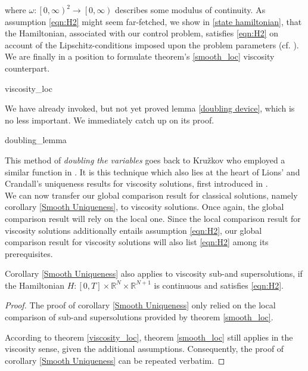 		 where $ \omega : \left[0, \infty \right)^2 \to \left[0, \infty \right) $ describes some modulus of continuity. As assumption \eqref{eqn:H2} 
		 might seem far-fetched, we show in \ref{state hamiltonian}, that the Hamiltonian, associated with our control problem, satisfies \eqref{eqn:H2} on account of the Lipschitz-conditions imposed upon the problem parameters (cf. \cite[p.~167]{zhou}). We are finally in a position to formulate theorem's \ref{smooth_loc} viscosity counterpart.
		 
		 {viscosity_loc}
		 
		 We have already invoked, but not yet proved lemma \ref{doubling device}, which is no less important. We immediately catch up on its proof.
		 
		 {doubling_lemma}
		 
		 This method of \emph{doubling the variables} goes back to Kru\v{z}kov who employed a similar function in \cite{kruvzkov}. It is this technique which also lies at the heart of Lions' and Crandall's uniqueness results for viscosity solutions, first introduced in \cite{lions}. \\
		 
		 We can now transfer our global comparison result for classical solutions, namely corollary \ref{Smooth Uniqueness}, to viscosity solutions. Once again, the global comparison result will rely on the local one. Since the local comparison result for viscosity solutions additionally entails assumption  \eqref{eqn:H2}, our global comparison result for viscosity solutions will also list \eqref{eqn:H2} among its prerequisites.
		  
		  \begin{corollary}
		  	\label{Viscosity Uniqueness}
		  	Corollary \ref{Smooth Uniqueness} also applies to viscosity sub-and supersolutions, if the Hamiltonian $ H : \left[ 0, T \right] \times \mathbb{R}^{N} \times \mathbb{R}^{N+1} $ is continuous and satisfies \eqref{eqn:H2}.
		  	
		  	\begin{proof}
		  		The proof of corollary \ref{Smooth Uniqueness} only relied on the local comparison of sub-and supersolutions provided by theorem \ref{smooth_loc}. 
		  		
		  		According to theorem \ref{viscosity_loc}, theorem \ref{smooth_loc} still applies in the viscosity sense, given the additional assumptions. Consequently, the proof of corollary \ref{Smooth Uniqueness} can be repeated verbatim.
		  	\end{proof}
		  \end{corollary}
		  